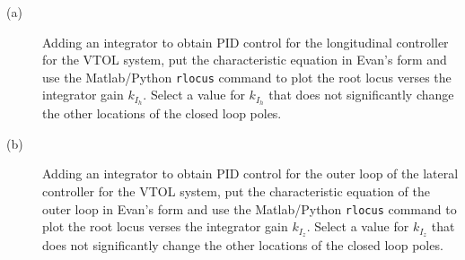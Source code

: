 \begin{description}
\item[(a)]Adding an integrator to obtain PID control for the longitudinal controller for the VTOL system, put the characteristic equation in Evan's form and use the Matlab/Python {\tt rlocus} command to plot the root locus verses the integrator gain $k_{I_h}$.  Select a value for $k_{I_h}$ that does not significantly change the other locations of the closed loop poles.  \item[(b)]
Adding an integrator to obtain PID control for the outer loop of the lateral controller for the VTOL system, put the characteristic equation of the outer loop in Evan's form and use the Matlab/Python {\tt rlocus} command to plot the root locus verses the integrator gain $k_{I_z}$.  Select a value for $k_{I_z}$ that does not significantly change the other locations of the closed loop poles.  
\end{description}
